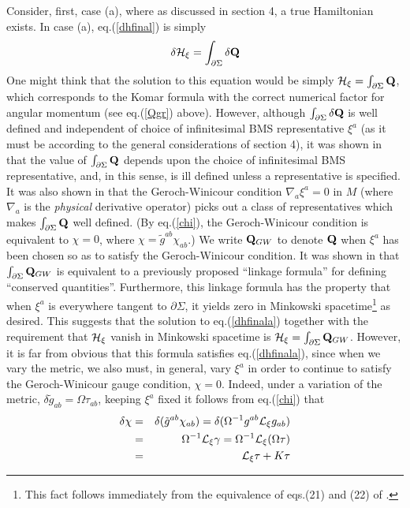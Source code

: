 Consider, first, case (a), where as discussed in section 4, a true
Hamiltonian exists. In case (a), eq.(\ref{dhfinal}) is simply
\begin{equation}
\delta {\cal H}_\xi = \int_{\partial \Sigma} \delta {\bf Q}
\label{dhfinala}
\end{equation}
One might think that the solution to this equation would be simply
${\cal H}_\xi = \int_{\partial \Sigma} {\bf Q}$, which corresponds to
the Komar formula with the correct numerical factor for angular
momentum (see eq.(\ref{Qgr}) above). However, although $\int_{\partial
\Sigma} \delta {\bf Q}$ is well defined and independent of choice of
infinitesimal BMS representative $\xi^a$ (as it must be according to
the general considerations of section 4), it was shown in \cite{gw}
that the value of $\int_{\partial \Sigma} {\bf Q}$ depends upon the
choice of infinitesimal BMS representative, and, in this sense, is ill
defined unless a representative is specified. It was also shown in
\cite{gw} that the Geroch-Winicour condition $\nabla_a \xi^a = 0$ in
$M$ (where $\nabla_a$ is the {\it physical} derivative operator) picks
out a class of representatives which makes $\int_{\partial \Sigma}
{\bf Q}$ well defined. (By eq.(\ref{chi}), the Geroch-Winicour
condition is equivalent to $\chi = 0$, where $\chi = \tilde{g}^{ab}
\chi_{ab}$.) We write ${\bf Q}_{GW}$ to denote ${\bf Q}$ when $\xi^a$
has been chosen so as to satisfy the Geroch-Winicour condition. It was
shown in \cite{gw} that $\int_{\partial \Sigma} {\bf Q}_{GW}$ is
equivalent to a previously proposed ``linkage formula'' \cite{tw} for
defining ``conserved quantities''. Furthermore, this linkage formula
has the property that when $\xi^a$ is everywhere tangent to $\partial
\Sigma$, it yields zero in Minkowski spacetime\footnote{This fact
follows immediately from the equivalence of eqs.(21) and (22) of
\cite{s}.} as desired. This suggests that the solution to
eq.(\ref{dhfinala}) together with the requirement that ${\cal H}_\xi$
vanish in Minkowski spacetime is ${\cal H}_\xi = \int_{\partial
\Sigma} {\bf Q}_{GW}$.  However, it is far from obvious that this
formula satisfies eq.(\ref{dhfinala}), since when we vary the metric,
we also must, in general, vary $\xi^a$ in order to continue to satisfy
the Geroch-Winicour gauge condition, $\chi = 0$. Indeed, under a
variation of the metric, $\delta \tilde{g}_{ab} = \Omega \tau_{ab}$,
keeping $\xi^a$ fixed it follows from eq.(\ref{chi}) that
\begin{eqnarray}
\delta \chi & = & \delta (\tilde{g}^{ab}
\chi_{ab}) = \delta(\Omega^{-1} g^{ab} {\cal L}_\xi g_{ab})
\nonumber \\
& = & \Omega^{-1} {\cal L}_\xi \gamma = \Omega^{-1} {\cal L}_\xi (\Omega \tau)
\nonumber \\
& = & {\cal L}_\xi \tau + K \tau
\label{dchi}
\end{eqnarray}
